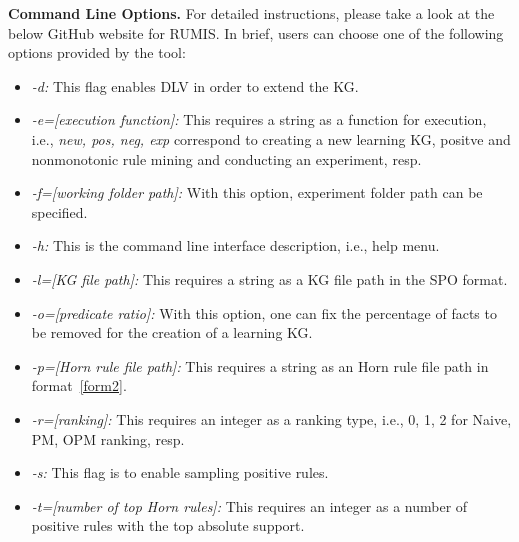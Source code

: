 %
%
%

\textbf{Command Line Options.} For detailed instructions, please take a look at the below GitHub website for RUMIS. In brief, users can choose one of the following options provided by the tool:

\begin{itemize}
\item \textit{-d:} This flag enables DLV in order to extend the KG.
\item \textit{-e=[execution function]:} This requires a string as a function for execution, i.e., \textit{new, pos, neg, exp} correspond to creating a new learning KG, positve and nonmonotonic rule mining and conducting an experiment, resp.
\item \textit{-f=[working folder path]:} With this option, experiment folder path can be specified.
\item \textit{-h:} This is the command line interface description, i.e., help menu.
\item \textit{-l=[KG file path]:} This requires a string as a KG file path in the SPO format.
\item \textit{-o=[predicate ratio]:} With this option, one can fix the percentage of facts to be removed for the creation of a learning KG.
\item \textit{-p=[Horn rule file path]:} This requires a string as an Horn rule file path in format~\ref{form2}.
\item \textit{-r=[ranking]:} This requires an integer as a ranking type, i.e., 0, 1, 2 for Naive, PM, OPM ranking, resp.
\item \textit{-s:} This flag is to enable sampling positive rules.
\item \textit{-t=[number of top Horn rules]:} This requires an integer as a number of positive rules with the top absolute support.
\end{itemize}

